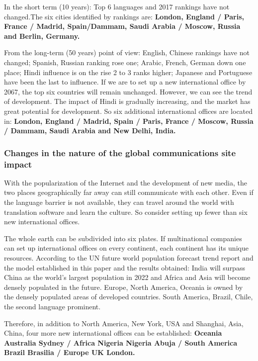 \par In the short term (10 years): Top 6 languages and 2017 rankings have not changed.The six cities identified by rankings are: \textbf{London, England / Paris, France / Madrid, Spain/Dammam, Saudi Arabia / Moscow, Russia and Berlin, Germany.}
\par From the long-term (50 years) point of view: English, Chinese rankings have not changed; Spanish, Russian ranking rose one; Arabic, French, German down one place; Hindi influence is on the rise 2 to 3 ranks higher; Japanese and Portuguese have been the last to influence. If we are to set up a new international office by 2067, the top six countries will remain unchanged. However, we can see the trend of development. The impact of Hindi is gradually increasing, and the market has great potential for development. So six additional international offices are located in:\textbf{ London, England / Madrid, Spain / Paris, France / Moscow, Russia / Dammam, Saudi Arabia and New Delhi, India.}

\subsubsection{Changes in the nature of the global communications site impact}
\noindent With the popularization of the Internet and the development of new media, the two places geographically far away can still communicate with each other. Even if the language barrier is not available, they can travel around the world with translation software and learn the culture. So consider setting up fewer than six new international offices.
\par The whole earth can be subdivided into six plates. If multinational companies can set up international offices on every continent, each continent has its unique resources. According to the UN future world population forecast trend report and the model established in this paper and the results obtained: India will surpass China as the world's largest population in 2022 and Africa and Asia will become densely populated in the future. Europe, North America, Oceania is owned by the densely populated areas of developed countries. South America, Brazil, Chile, the second language prominent.
\par Therefore, in addition to North America, New York, USA and Shanghai, Asia, China, four more new international offices can be established: \textbf{Oceania Australia Sydney / Africa Nigeria Nigeria Abuja / South America Brazil Brasilia / Europe UK London.}

 
